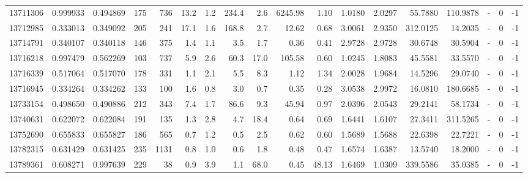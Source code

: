 \begin{tabular}{rrrrrrrrrrrrrrrlrr}
  13711306 & 0.999933 &   0.494869 &  175 &  736 &     13.2 &      1.2 &   234.4 &      2.6 &    6245.98 &        1.10 &  1.0180 &  2.0297 &   55.7880 &  110.9878 &             - &        0 &         -1 \\
  13712985 & 0.333013 &   0.349092 &  205 &  241 &     17.1 &      1.6 &   168.8 &      2.7 &      12.62 &        0.68 &  3.0061 &  2.9350 &  312.0125 &   14.2035 &             - &        0 &         -1 \\
  13714791 & 0.340107 &   0.340118 &  146 &  375 &      1.4 &      1.1 &     3.5 &      1.7 &       0.36 &        0.41 &  2.9728 &  2.9728 &   30.6748 &   30.5904 &             - &        0 &         -1 \\
  13716218 & 0.997479 &   0.562269 &  103 &  737 &      5.9 &      2.6 &    60.3 &     17.0 &     105.58 &        0.60 &  1.0245 &  1.8083 &   45.5581 &   33.5570 &             - &        0 &         -1 \\
  13716339 & 0.517064 &   0.517070 &  178 &  331 &      1.1 &      2.1 &     5.5 &      8.3 &       1.12 &        1.34 &  2.0028 &  1.9684 &   14.5296 &   29.0740 &             - &        0 &         -1 \\
  13716945 & 0.334264 &   0.334262 &  133 &  100 &      1.6 &      0.8 &     3.0 &      0.7 &       0.35 &        0.28 &  3.0538 &  2.9972 &   16.0810 &  180.6685 &             - &        0 &         -1 \\
  13733154 & 0.498650 &   0.490886 &  212 &  343 &      7.4 &      1.7 &    86.6 &      9.3 &      45.94 &        0.97 &  2.0396 &  2.0543 &   29.2141 &   58.1734 &             - &        0 &         -1 \\
  13740631 & 0.622072 &   0.622084 &  191 &  135 &      1.3 &      2.8 &     4.7 &     18.4 &       0.64 &        0.69 &  1.6441 &  1.6107 &   27.3411 &  311.5265 &             - &        0 &         -1 \\
  13752690 & 0.655833 &   0.655827 &  186 &  565 &      0.7 &      1.2 &     0.5 &      2.5 &       0.62 &        0.60 &  1.5689 &  1.5688 &   22.6398 &   22.7221 &             - &        0 &         -1 \\
  13782315 & 0.631429 &   0.631425 &  235 & 1131 &      0.8 &      1.0 &     0.6 &      1.8 &       0.48 &        0.47 &  1.6574 &  1.6387 &   13.5740 &   18.2000 &             - &        0 &         -1 \\
  13789361 & 0.608271 &   0.997639 &  229 &   38 &      0.9 &      3.9 &     1.1 &     68.0 &       0.45 &       48.13 &  1.6469 &  1.0309 &  339.5586 &   35.0385 &             - &        0 &         -1 \\

\end{tabular}
